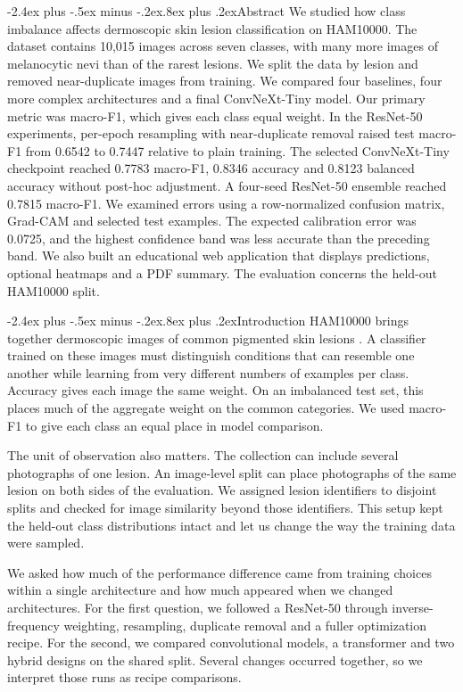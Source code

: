 \documentclass[11pt,a4paper]{article}
\makeatletter
\renewcommand\section{\@startsection{section}{1}{\z@}%
  {-2.4ex plus -.5ex minus -.2ex}{.8ex plus .2ex}{\sffamily\Large\bfseries\color{teal}}}
\makeatother
\begin{document}
\section{Abstract}
We studied how class imbalance affects dermoscopic skin lesion classification on HAM10000. The dataset contains 10,015 images across seven classes, with many more images of melanocytic nevi than of the rarest lesions. We split the data by lesion and removed near-duplicate images from training. We compared four baselines, four more complex architectures and a final ConvNeXt-Tiny model. Our primary metric was macro-F1, which gives each class equal weight. In the ResNet-50 experiments, per-epoch resampling with near-duplicate removal raised test macro-F1 from 0.6542 to 0.7447 relative to plain training. The selected ConvNeXt-Tiny checkpoint reached 0.7783 macro-F1, 0.8346 accuracy and 0.8123 balanced accuracy without post-hoc adjustment. A four-seed ResNet-50 ensemble reached 0.7815 macro-F1. We examined errors using a row-normalized confusion matrix, Grad-CAM and selected test examples. The expected calibration error was 0.0725, and the highest confidence band was less accurate than the preceding band. We also built an educational web application that displays predictions, optional heatmaps and a PDF summary. The evaluation concerns the held-out HAM10000 split.

\section{Introduction}
HAM10000 brings together dermoscopic images of common pigmented skin lesions \citep{tschandl2018}. A classifier trained on these images must distinguish conditions that can resemble one another while learning from very different numbers of examples per class. Accuracy gives each image the same weight. On an imbalanced test set, this places much of the aggregate weight on the common categories. We used macro-F1 to give each class an equal place in model comparison.

The unit of observation also matters. The collection can include several photographs of one lesion. An image-level split can place photographs of the same lesion on both sides of the evaluation. We assigned lesion identifiers to disjoint splits and checked for image similarity beyond those identifiers. This setup kept the held-out class distributions intact and let us change the way the training data were sampled.

We asked how much of the performance difference came from training choices within a single architecture and how much appeared when we changed architectures. For the first question, we followed a ResNet-50 through inverse-frequency weighting, resampling, duplicate removal and a fuller optimization recipe. For the second, we compared convolutional models, a transformer and two hybrid designs on the shared split. Several changes occurred together, so we interpret those runs as recipe comparisons.
\end{document}
